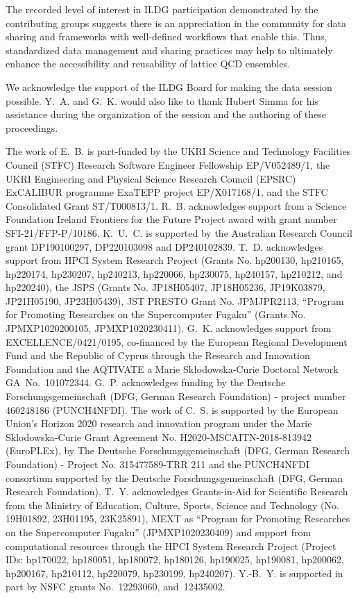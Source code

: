 \documentclass[a4paper,11pt]{article}
\begin{document}
The recorded level of interest in ILDG participation demonstrated by
the contributing groups suggests there is an appreciation in the
community for data sharing and frameworks with well-defined workflows
that enable this. Thus, standardized data management and sharing
practices may help to ultimately enhance the accessibility and
reusability of lattice QCD ensembles.

\acknowledgments

We acknowledge the support of the ILDG Board for making the data
session possible. Y.~A. and G.~K.  would also like to thank Hubert
Simma for his assistance during the organization of the session and
the authoring of these proceedings.

The work of E.~B. is part-funded by the UKRI Science and Technology
Facilities Council (STFC) Research Software Engineer Fellowship
EP/V052489/1, the UKRI Engineering and Physical Science Research
Council (EPSRC) ExCALIBUR programme ExaTEPP project EP/X017168/1, and
the STFC Consolidated Grant ST/T000813/1. R.~B. acknowledges support
from a Science Foundation Ireland Frontiers for the Future Project
award with grant number SFI-21/FFP-P/10186. K.~U.~C. is supported by
the Australian Research Council grant DP190100297, DP220103098 and
DP240102839. T.~D. acknowledges support from HPCI System Research
Project (Grants No. hp200130, hp210165, hp220174, hp230207, hp240213,
hp220066, hp230075, hp240157, hp210212, and hp220240), the JSPS
(Grants No. JP18H05407, JP18H05236, JP19K03879, JP21H05190,
JP23H05439), JST PRESTO Grant No. JPMJPR2113, ``Program for Promoting
Researches on the Supercomputer Fugaku'' (Grants No. JPMXP1020200105,
JPMXP1020230411). G.~K. acknowledges support from
EXCELLENCE/0421/0195, co-financed by the European Regional Development
Fund and the Republic of Cyprus through the Research and Innovation
Foundation and the AQTIVATE a Marie Sk\l{}odowska-Curie Doctoral
Network GA~No.~101072344.  G.~P. acknowledges funding by the Deutsche
Forschungsgemeinschaft (DFG, German Research Foundation) - project
number 460248186 (PUNCH4NFDI). The work of C.~S. is supported by the
European Union's Horizon 2020 research and innovation program under
the Marie Sklodowska-Curie Grant Agreement
No. H2020-MSCAITN-2018-813942 (EuroPLEx), by The Deutsche
Forschungsgemeinschaft (DFG, German Research Foundation) - Project
No. 315477589-TRR 211 and the PUNCH4NFDI consortium supported by the
Deutsche Forschungsgemeinschaft (DFG, German Research
Foundation). T.~Y.  acknowledges Grants-in-Aid for Scientific Research
from the Ministry of Education, Culture, Sports, Science and
Technology (No. 19H01892, 23H01195, 23K25891), MEXT as ``Program for
Promoting Researches on the Supercomputer Fugaku'' (JPMXP1020230409)
and support from computational resources through the HPCI System
Research Project (Project IDs: hp170022, hp180051, hp180072, hp180126,
hp190025, hp190081, hp200062, hp200167, hp210112, hp220079, hp230199,
hp240207). Y.-B.~Y. is supported in part by NSFC grants No.~12293060,
and~12435002.
\end{document}
